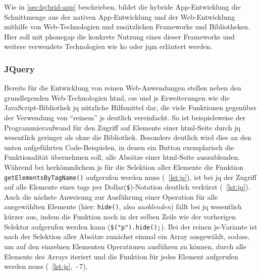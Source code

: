 Wie in \ref{sec:hybrid-app} beschrieben, bildet die hybride App-Entwicklung die Schnittmenge aus der nativen App-Entwicklung und der Web-Entwicklung mithilfe von Web-Technologien und zusätzlichen Frameworks und Bibliotheken. 
Hier soll mit \gls{phonegap} die konkrete Nutzung eines dieser Frameworks und weitere verwendete Technologien wie \gls{ko} oder \gls{jqm} erläutert werden.

\subsubsection{JQuery}

Bereits für die Entwicklung von reinen Web-Anwendungen stellen neben den grundlegenden Web-Technologien \gls{html}, \gls{css} und \gls{js} Erweiterungen wie die JavaScript-Bibliothek \gls{jq} nützliche Hilfsmittel dar, die viele Funktionen gegenüber der Verwendung von \enquote{reinem} \gls{js} deutlich vereinfacht.
So ist beispielsweise der Programmieraufwand für den Zugriff auf Elemente einer \gls{html}-Seite durch \gls{jq} wesentlich geringer als ohne die Bibliothek.
Besonders deutlich wird dies an den unten aufgeführten Code-Beispielen, in denen ein Button exemplarisch die Funktionalität übernehmen soll, alle Absätze einer \gls{html}-Seite auszublenden.
Während bei herkömmlichem \gls{js} für die Selektion aller Elemente die Funktion \verb|getElementsByTagName()| aufgerufen werden muss (\seename~\autoref{lst:js}), ist bei \gls{jq} der Zugriff auf alle Elemente eines \glspl{tag} per Dollar(\verb|$|)-Notation deutlich verkürzt (\seename~\autoref{lst:jq}).
Auch die nächste Anweisung zur Ausführung einer Operation für alle ausgewählten Elemente (hier: \verb|hide()|, also \textit{ausblenden}) fällt bei \gls{jq} wesentlich kürzer aus, indem die Funktion noch in der selben Zeile wie der vorherigen Selektor aufgerufen werden kann (\verb|$("p").hide();|).
Bei der reinen \gls{js}-Variante ist nach der Selektion aller Absätze zunächst einmal ein Array ausgewählt, sodass, um auf den einzelnen Elementen Operationen ausführen zu können, durch alle Elemente des Arrays iteriert und die Funktion für jedes Element aufgerufen werden muss (\seename~\autoref{lst:js}, \,-\,7). 





